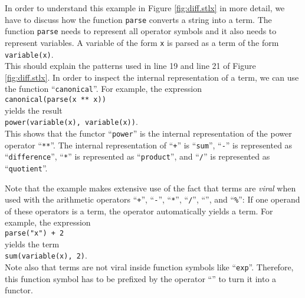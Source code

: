 In order to understand this example in Figure \ref{fig:diff.stlx} in more
detail, we have to discuss how the function \texttt{parse} converts a string into a term.  The
function \texttt{parse} needs to represent all operator symbols and it also needs to represent
variables.  A variable of the form \texttt{x} is parsed as a
term of the form
\\[0.2cm]
\hspace*{1.3cm}
\texttt{variable(x)}.
\\[0.2cm]
This should explain the patterns used in line 19 and line 21 of Figure \ref{fig:diff.stlx}.
In order to inspect the internal representation of a term, we can use the function
``\texttt{canonical}''.  For example, the expression
\\[0.2cm]
\hspace*{1.3cm}
\texttt{canonical(parse(x ** x))}
\\[0.2cm]
yields the result
\\[0.2cm]
\hspace*{1.3cm}
\texttt{power(variable(x), variable(x))}.
\\[0.2cm]
This shows that the functor ``\texttt{power}'' is the internal representation of the
power operator ``\texttt{**}''.  The internal representation of 
``\texttt{+}'' is ``\texttt{sum}'',
``\texttt{-}'' is represented as ``\texttt{difference}'',
``\texttt{*}'' is represented as ``\texttt{product}'', and
``\texttt{/}'' is represented as ``\texttt{quotient}''.

Note that the example makes extensive use of the fact that terms are \emph{viral} when used with
the arithmetic operators 
``\texttt{+}'', ``\texttt{-}'', ``\texttt{*}'', ``\texttt{/}'', ``\texttt{}'', and
``\texttt{\%}'':  
If one operand of these operators is a term, the operator automatically yields a term.
For example, the expression 
\\[0.2cm]
\hspace*{1.3cm}
\texttt{parse("x") + 2}
\\[0.2cm]
yields the term
\\[0.2cm]
\hspace*{1.3cm}
\texttt{sum(variable(x), 2)}.
\\[0.2cm]
Note also that terms are not viral inside function symbols like ``\texttt{exp}''.  Therefore, this
function symbol has to be prefixed by the operator ``\texttt{}'' to turn it
into a functor.

